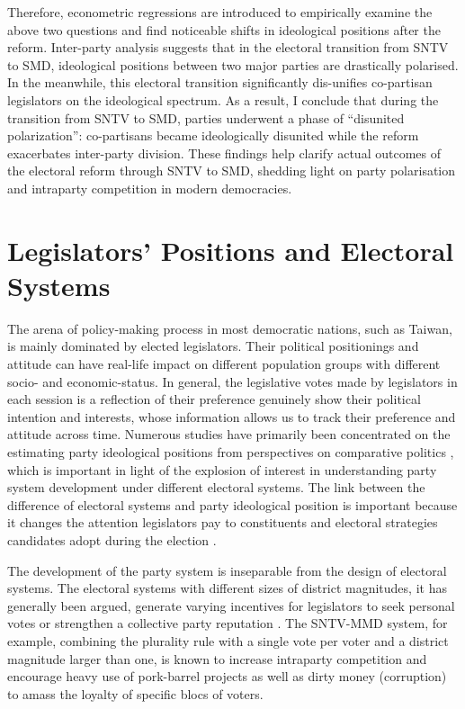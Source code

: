 Therefore, econometric regressions are introduced to empirically examine the above two questions and find noticeable shifts in ideological positions after the reform.  Inter-party analysis suggests that in the electoral transition from SNTV to SMD, ideological positions between two major parties are drastically polarised. In the meanwhile, this electoral transition significantly dis-unifies co-partisan legislators on the ideological spectrum. As a result, I conclude that during the transition from SNTV to SMD, parties underwent a phase of ``disunited polarization'': co-partisans became ideologically disunited while the reform exacerbates inter-party division. These findings help clarify actual outcomes of the electoral reform through SNTV to SMD, shedding light on party polarisation and intraparty competition in modern democracies. 

\section*{\centering Legislators' Positions and Electoral Systems}
The arena of policy-making process in most democratic nations, such as Taiwan, is mainly dominated by elected legislators. Their political positionings and attitude can have real-life impact on different population groups with different socio- and economic-status. In general, the legislative votes made by legislators in each session is a reflection of their preference genuinely show their political intention and interests, whose information allows us to track their preference and attitude across time. Numerous studies have primarily been concentrated on the estimating party ideological positions from perspectives on comparative politics \citep[e.g.,][]{Carroll2019, Hix2009,Budge1994, Lo2014, Curini2012, Catalinac2016}, which is important in light of the explosion of interest in understanding party system development under different electoral systems. The link between the difference of electoral systems and party ideological position is important because it changes the attention legislators pay to constituents and electoral strategies candidates adopt during the election \citep[][]{Andre2015, Andre2014b, Catalinac2016, Fiva2020, Luor2008, Luor2009}. 

The development of the party system is inseparable from the design of electoral systems. The electoral systems with different sizes of district magnitudes, it has generally been argued, generate varying incentives for legislators to seek personal votes or strengthen a collective party reputation \citep[][]{Andre2015,Andre2015, Carey1995, Cox1997}. The SNTV-MMD system, for example, combining the plurality rule with a single vote per voter and a district magnitude larger than one, is known to increase intraparty competition \citep{Calvo2011, Cox1990, Reed2003, Carey1995, Merrill2002} and encourage heavy use of pork-barrel projects \citep[e.g.][]{Reed2005, Shugart2005, Hirano2006} as well as dirty money (corruption) \citep[][]{Chang2007} to amass the loyalty of specific blocs of voters.

